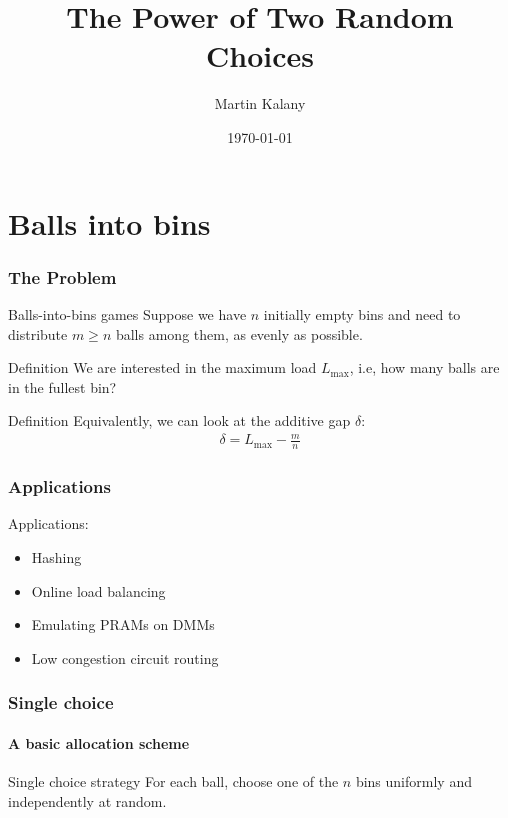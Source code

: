 \documentclass[serif,professionalfonts]{beamer}
\title{The Power of Two Random Choices}
\author[M. Kalany]{Martin Kalany}
\institute[TU Wien]
{
  Graduate student in Computer Science\\
  Vienna University of Technology\\
}
\date{\today}
\newcommand\load{L_{\mathrm{max}}}
\newcommand\scalefac{0.55}
\newcommand\ballsize{5mm}
\newcommand\nrbins{6}
\newcommand\padding{0.1*\ballsize}
\newcommand\bingap{1.6*\balldiameter}
\newcommand\balldiameter{2*\ballsize}
\newcommand\iA[2][0]{
	\path (\nbid) edge[insert, bend left=#1] (#2);
}
\newcommand\bin[1]{
	\path node[topflat, xshift=#1*\bingap*\scalefac, above, yshift=-\padding*\scalefac]  {};
}
\newcommand\bins{
	\foreach \ibin in {1,...,\nrbins}
		\bin{\ibin};
}
\newcommand\setNode[2]{
	\draw let \n1 ={#1#2} in node[circle, minimum size = \ballsize](n\n1) at (#1*\bingap,#2*\balldiameter-\ballsize) {};
}
\newcommand\nodes{
	\foreach \i in {1,...,6}
		\foreach \j in {1,...,5}
			\setNode{\i}{\j};
}
\newcommand\ball[2]{
	\shade[ballstyle] (#1*\bingap,#2*\balldiameter-\ballsize) circle (\ballsize) {};
}
\newcommand\nbid{nb}
\newcommand\newball{
	\draw node[circle, minimum size = \ballsize](\nbid) at (0*\bingap,6*\balldiameter-\ballsize) {};
	\ball{0}{6};
}
\newcommand\putinbin[2]{
	\ifnum #2 > 0
		\foreach \nrballs in {1,...,#2}
 			\ball{#1}{\nrballs};
 	\fi
}
\newcounter{index}
\newcommand\balls[1]{%
	\getargsC{#1}%
  	\setcounter{index}{0}%
  	\whiledo{\theindex < \narg}{%
    		\stepcounter{index}%
    		\putinbin{\theindex}{\csname arg\romannumeral\theindex\endcsname}%
  	}%
}
\newcommand\bab[1]{%
	\bins
	\nodes
	\balls{#1}
}
\begin{document}
\begin{frame}
  \titlepage
\end{frame}
\note{}

\section{Balls into bins}
\begin{frame}
\frametitle{The Problem}
\begin{exampleblock}{Balls-into-bins games}
Suppose we have $n$ initially empty bins and need to distribute $m \geq n$ balls among them, \alert{as evenly as possible}. 
\end{exampleblock}

\begin{exampleblock}{Definition}
We are interested in the \alert{maximum load $\load$}, i.e, how many balls are in the fullest bin?
\end{exampleblock}

\begin{exampleblock}{Definition}
Equivalently, we can look at the \alert{additive gap} $\delta$:
\begin{align*}
\delta = \load - \frac{m}{n}
\end{align*}
\end{exampleblock}
\end{frame}

\begin{frame}
\frametitle{Applications}
Applications:
\begin{itemize}
	\item Hashing
	\item Online load balancing
	\item Emulating PRAMs on DMMs
	\item Low congestion circuit routing
\end{itemize}
\end{frame}

\begin{frame}
\frametitle{Single choice}
\framesubtitle{A basic allocation scheme}
\begin{exampleblock}{Single choice strategy}
For each ball, choose one of the $n$ bins uniformly and independently at random.
\end{exampleblock}

\bigskip

\begin{center}
\end{center}
\end{frame}
\end{document}
